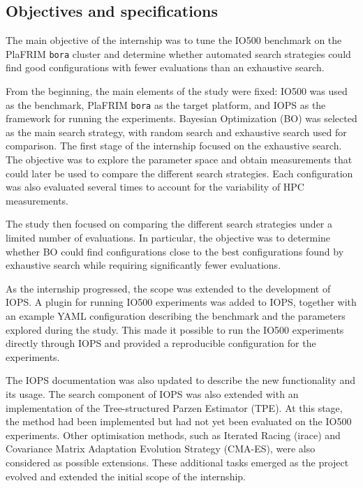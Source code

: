 \subsection{Objectives and specifications}


The main objective of the internship was to tune the IO500 benchmark on
the PlaFRIM \texttt{bora} cluster and determine whether automated search
strategies could find good configurations with fewer evaluations than an
exhaustive search.

From the beginning, the main elements of the study were fixed: IO500 was
used as the benchmark, PlaFRIM \texttt{bora} as the target platform, and
IOPS as the framework for running the experiments. Bayesian Optimization
(BO) was selected as the main search strategy, with random search and
exhaustive search used for comparison. The first stage of the internship focused on the exhaustive search. The
objective was to explore the parameter space and obtain measurements that
could later be used to compare the different search strategies. Each
configuration was also evaluated several times to account for the
variability of HPC measurements.

The study then focused on comparing the different search strategies under
a limited number of evaluations. In particular, the objective was to
determine whether BO could find configurations close to the best
configurations found by exhaustive search while requiring significantly
fewer evaluations.

As the internship progressed, the scope was extended to the development
of IOPS. A plugin for running IO500 experiments was added to IOPS,
together with an example YAML configuration describing the benchmark and
the parameters explored during the study. This made it possible to run
the IO500 experiments directly through IOPS and provided a reproducible
configuration for the experiments. 

The IOPS documentation was also updated to describe the new functionality
and its usage. The search component of IOPS was also extended with an implementation of
the Tree-structured Parzen Estimator (TPE). At this stage, the method had
been implemented but had not yet been evaluated on the IO500 experiments.
Other optimisation methods, such as Iterated Racing (irace) and
Covariance Matrix Adaptation Evolution Strategy (CMA-ES), were also
considered as possible extensions. These additional tasks emerged as the project evolved and extended the
initial scope of the internship.



